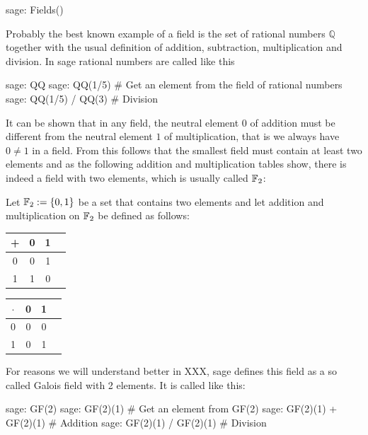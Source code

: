 \begin{sagecommandline}
sage: Fields()
\end{sagecommandline}

\begin{example} Probably the best known example of a field is the set of rational numbers $\mathbb{Q}$ together with the usual definition of addition, subtraction, multiplication and division. In sage rational numbers are called like this
\begin{sagecommandline}
sage: QQ
sage: QQ(1/5) # Get an element from the field of rational numbers
sage: QQ(1/5) / QQ(3) # Division
\end{sagecommandline}
\end{example}
\begin{example} It can be shown that in any field, the neutral element $0$ of addition must be different from the neutral element $1$ of multiplication, that is we always have $0\neq 1$ in a field. From this follows that the smallest field must contain at least two elements and as the following addition and multiplication tables show, there is indeed a field with two elements, which is usually called $\mathbb{F}_2$:

Let $\mathbb{F}_2:=\{0,1 \}$ be a set that contains two elements and let addition and multiplication on $\mathbb{F}_2$ be defined as follows:
\begin{center}
  \begin{tabular}{c | c c c}
    + & 0 & 1 \\\hline
    0 & 0 & 1\\
    1 & 1 & 0 \\
  \end{tabular} \quad \quad \quad \quad
  \begin{tabular}{c | c c c}
$\cdot$ & 0 & 1 \\\hline
      0 & 0 & 0 \\
      1 & 0 & 1 \\
  \end{tabular}
\end{center}
For reasons we will understand better in XXX, sage defines this field as a so called Galois field with 2 elements. It is called like this:
\begin{sagecommandline}
sage: GF(2)
sage: GF(2)(1) # Get an element from GF(2)
sage: GF(2)(1) + GF(2)(1) # Addition
sage: GF(2)(1) / GF(2)(1) # Division
\end{sagecommandline}
\end{example}


